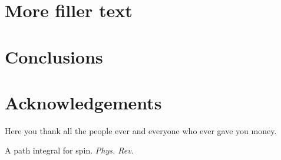 \documentclass[twoside,british,a4paper,twocolumn]{article}
\begin{document}
\lipsum[1-2]


\section{More filler text}

\lipsum[1-6]

\section{Conclusions}

\lipsum[11-12]


\section*{Acknowledgements}
Here you thank all the people ever and everyone who ever gave you money.

A path integral for spin. \textit{Phys. Rev.}



 
{}
\end{document}
